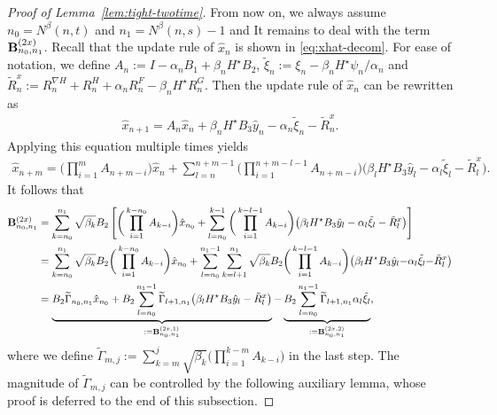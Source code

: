 \documentclass[11pt]{article}
\theoremstyle{plain}
\theoremstyle{definition}
\def\nablaH{\nabla H}
\def\mI{{\bm{I}}}
\def\EB{{\mathbb E}}
\newcommand{\xhat}{{\hat{x}}}
\newcommand{\yhat}{{\hat{y}}}
\def\mI{{I}}
\newcommand{\ssum}[3]{\sum\limits_{{#1}={#2}}^{#3}}
\def\bfB{{\bf B}}
\begin{document}
\begin{appendix}
\begin{proof}[Proof of Lemma~\ref{lem:tight-twotime}]
    From now on, we always assume $n_0 = N^\beta(n,t)$ and $n_1 = N^\beta(n,s)-1$ and
    It remains to deal with the term $\bfB^{(2x)}_{n_0, n_1}$.
    Recall that the update rule of $\xhat_{n}$ is shown in \eqref{eq:xhat-decom}.
    For ease of notation, we define $A_{n}:= \mI - \alpha_{n} B_1 + \beta_{n} H^\star B_2$, $\tilde{\xi}_{n} := \xi_{n} - \beta_{n} H^\star \psi_{n} / \alpha_{n}$ and 
    $\tilde{R}^x_{n} := R^{\nablaH}_{n} + R^H_{n} + \alpha_{n} R^F_{n} - \beta_{n} H^\star R^G_{n}$.
    Then the update rule of $\xhat_{n}$ can be rewritten as
    \begin{align*}
        \xhat_{n+1} = A_{n} \xhat_{n} + \beta_{n} H^\star B_3 \yhat_{n} - \alpha_{n} \tilde{\xi}_{n} - \tilde{R}^x_{n}.
    \end{align*}
    Applying this equation multiple times yields
    \begin{align*}
        \xhat_{n+m}
        = \bigg( \prod_{i=1}^{m} A_{n+m-i} \bigg) \xhat_{n}
        + \sum_{l=n}^{n+m-1} \bigg( \prod_{i=1}^{n+m-l-1} A_{n+m-i} \bigg) \big( \beta_{l} H^\star B_3 \yhat_{l} - \alpha_{l} \tilde{\xi}_{l} - \tilde{R}^x_{l} \big).
    \end{align*}
    It follows that
    \begin{align*}
        \bfB^{(2x)}_{n_0, n_1}
        & = \ssum{k}{n_0}{n_1} \sqrt{\beta_{k}} B_2 \left[ \bigg( \prod_{i=1}^{k-n_{0}} A_{k-i} \bigg) \xhat_{n_0} + \ssum{l}{n_0}{k-1} \bigg( \prod_{i=1}^{k-l-1} A_{k-i} \bigg) \big( \beta_{l} H^\star B_3 \yhat_{l} - \alpha_{l} \tilde{\xi}_{l} - \tilde{R}^x_{l} \big) \right] \\
        & = \ssum{k}{n_0}{n_1} \sqrt{\beta_{k}} B_2 \bigg( \prod_{i=1}^{k-n_{0}} A_{k-i} \bigg) \xhat_{n_0} 
        + \ssum{l}{n_0}{n_1-1} \ssum{k}{l+1}{n_1} \sqrt{\beta_{k}} B_2 \bigg( \prod_{i=1}^{k-l-1} A_{k-i} \bigg) \big( \beta_{l} H^\star B_3 \yhat_{l} {-} \alpha_{l} \tilde{\xi}_{l} {-} \tilde{R}^x_{l} \big) \\
        & = \underbrace{ B_2 \widetilde{\Gamma}_{n_0, n_1} \xhat_{n_0} 
            + B_2 \ssum{l}{n_0}{n_1-1} \widetilde{\Gamma}_{l+1, n_1} \big( \beta_{l} H^\star B_3 \yhat_{l}  - \tilde{R}^x_{l} \big) }_{:= \bfB^{(2x,1)}_{n_0,n_1} }
        - \underbrace{ B_2 \ssum{l}{n_0}{n_1-1} \widetilde{\Gamma}_{l+1, n_1} \alpha_{l} \tilde{\xi}_{l} }_{:= \bfB^{(2x,2)}_{n_0,n_1} },
    \end{align*}
    where we define $\widetilde{\Gamma}_{m, j} := \ssum{k}{m}{j} \sqrt{\beta_{k}} \bigg( \prod_{i=1}^{k-m} A_{k-i} \bigg)$ in the last step.
    The magnitude of $\widetilde{\Gamma}_{m, j}$ can be controlled by the following auxiliary lemma, whose proof is deferred to the end of this subsection.
    

\end{proof}
\end{appendix}
\end{document}
